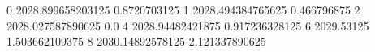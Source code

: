 0 2028.899658203125 0.8720703125
1 2028.494384765625 0.466796875
2 2028.027587890625 0.0
4 2028.94482421875 0.917236328125
6 2029.53125 1.503662109375
8 2030.14892578125 2.121337890625
